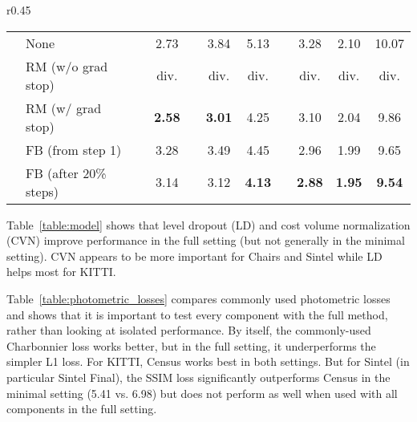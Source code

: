 \documentclass[runningheads]{llncs}
\def\rot#1{\rotatebox{90}{#1}}
\begin{document}
\begin{wraptable}{r}{0.45\columnwidth}
{\begin{tabular}{llccccccccc}
    & None && 2.73 && 3.84 & 5.13 && 3.28 & 2.10 & 10.07 \\
    & RM (w/o grad stop) && div. && div. & div. && div. & div. & div. \\
    & RM (w/ grad stop) && {\bf 2.58} && {\bf 3.01} & 4.25 && 3.10 & 2.04 & 9.86 \\
    & FB (from step 1) && 3.28 && 3.49 & 4.45 && 2.96 & 1.99 & 9.65 \\
    & FB (after 20\% steps)&& 3.14 && 3.12 & {\bf 4.13} && {\bf 2.88} & {\bf 1.95} & {\bf 9.54} \\
    \bottomrule
    \end{tabular}}
\end{wraptable}

 Table~\ref{table:model} shows that level dropout (LD) and cost volume normalization (CVN) improve performance in the full setting (but not generally in the minimal setting). CVN appears to be more important for Chairs and Sintel while LD helps most for KITTI.

 Table~\ref{table:photometric_losses} compares commonly used photometric losses and shows that it is important to test every component with the full method, rather than looking at isolated performance. By itself, the commonly-used Charbonnier loss works better, but in the full setting, it underperforms the simpler L1 loss. For KITTI, Census works best in both settings. But for Sintel (in particular Sintel Final), the SSIM loss significantly outperforms Census in the minimal setting (5.41 vs. 6.98) but does not perform as well when used with all components in the full setting.

\newcommand{\resultswidth}{1.06in}
\newcommand{\resultsspace}{\,}
\newcommand{\sidelabel}[1]{\rot{\footnotesize #1}}

\newcommand{\ablationimage}[1]{
\texttt{[image: images/core\_components/\#1]}
}
\end{document}
